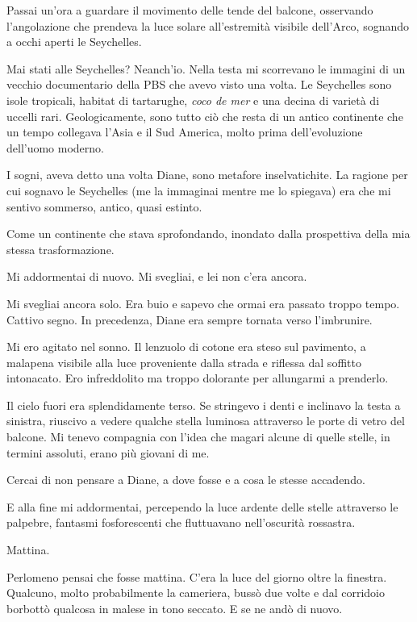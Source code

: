 Passai un'ora a guardare il movimento delle tende del balcone,
osservando l'angolazione che prendeva la luce solare all'estremità
visibile dell'Arco, sognando a occhi aperti le Seychelles.

Mai stati alle Seychelles? Neanch'io. Nella testa mi scorrevano le
immagini di un vecchio documentario della PBS che avevo visto una volta.
Le Seychelles sono isole tropicali, habitat di tartarughe, \emph{coco de
	mer} e una decina di varietà di uccelli rari. Geologicamente, sono tutto
ciò che resta di un antico continente che un tempo collegava l'Asia e il
Sud America, molto prima dell'evoluzione dell'uomo moderno.

I sogni, aveva detto una volta Diane, sono metafore inselvatichite. La
ragione per cui sognavo le Seychelles (me la immaginai mentre me lo
spiegava) era che mi sentivo sommerso, antico, quasi estinto.

Come un continente che stava sprofondando, inondato dalla prospettiva
della mia stessa trasformazione.

\separatorefiori

Mi addormentai di nuovo. Mi svegliai, e lei non c'era ancora.

\separatorefiori

Mi svegliai ancora solo. Era buio e sapevo che ormai era passato troppo
tempo. Cattivo segno. In precedenza, Diane era sempre tornata verso
l'imbrunire.

Mi ero agitato nel sonno. Il lenzuolo di cotone era steso sul pavimento,
a malapena visibile alla luce proveniente dalla strada e riflessa dal
soffitto intonacato. Ero infreddolito ma troppo dolorante per allungarmi
a prenderlo.

Il cielo fuori era splendidamente terso. Se stringevo i denti e
inclinavo la testa a sinistra, riuscivo a vedere qualche stella luminosa
attraverso le porte di vetro del balcone. Mi tenevo compagnia con l'idea
che magari alcune di quelle stelle, in termini assoluti, erano più
giovani di me.

Cercai di non pensare a Diane, a dove fosse e a cosa le stesse
accadendo.

E alla fine mi addormentai, percependo la luce ardente delle stelle
attraverso le palpebre, fantasmi fosforescenti che fluttuavano
nell'oscurità rossastra.

\separatorefiori

Mattina.

Perlomeno pensai che fosse mattina. C'era la luce del giorno oltre la
finestra. Qualcuno, molto probabilmente la cameriera, bussò due volte e
dal corridoio borbottò qualcosa in malese in tono seccato. E se ne andò
di nuovo.

